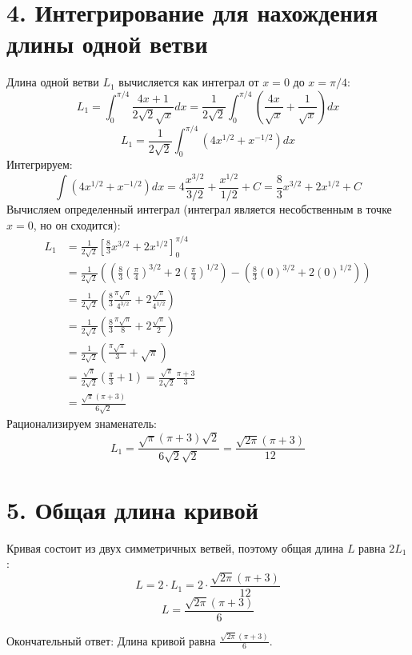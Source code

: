 \documentclass{article}
\begin{document}
\section*{4. Интегрирование для нахождения длины одной ветви}
Длина одной ветви $L_1$ вычисляется как интеграл от $x=0$ до $x=\pi/4$:
\[ L_1 = \int_0^{\pi/4} \frac{4x+1}{2\sqrt{2}\sqrt{x}} dx = \frac{1}{2\sqrt{2}} \int_0^{\pi/4} \left(\frac{4x}{\sqrt{x}} + \frac{1}{\sqrt{x}}\right) dx \]
\[ L_1 = \frac{1}{2\sqrt{2}} \int_0^{\pi/4} (4x^{1/2} + x^{-1/2}) dx \]
Интегрируем:
\[ \int (4x^{1/2} + x^{-1/2}) dx = 4\frac{x^{3/2}}{3/2} + \frac{x^{1/2}}{1/2} + C = \frac{8}{3}x^{3/2} + 2x^{1/2} + C \]
Вычисляем определенный интеграл (интеграл является несобственным в точке $x=0$, но он сходится):
\begin{align*}
    L_1 &= \frac{1}{2\sqrt{2}} \left[ \frac{8}{3}x^{3/2} + 2x^{1/2} \right]_0^{\pi/4} \\
    &= \frac{1}{2\sqrt{2}} \left( \left(\frac{8}{3}\left(\frac{\pi}{4}\right)^{3/2} + 2\left(\frac{\pi}{4}\right)^{1/2}\right) - \left(\frac{8}{3}(0)^{3/2} + 2(0)^{1/2}\right) \right) \\
    &= \frac{1}{2\sqrt{2}} \left( \frac{8}{3} \frac{\pi\sqrt{\pi}}{4^{3/2}} + 2\frac{\sqrt{\pi}}{4^{1/2}} \right) \\
    &= \frac{1}{2\sqrt{2}} \left( \frac{8}{3} \frac{\pi\sqrt{\pi}}{8} + 2\frac{\sqrt{\pi}}{2} \right) \\
    &= \frac{1}{2\sqrt{2}} \left( \frac{\pi\sqrt{\pi}}{3} + \sqrt{\pi} \right) \\
    &= \frac{\sqrt{\pi}}{2\sqrt{2}} \left( \frac{\pi}{3} + 1 \right) = \frac{\sqrt{\pi}}{2\sqrt{2}} \frac{\pi+3}{3} \\
    &= \frac{\sqrt{\pi}(\pi+3)}{6\sqrt{2}}
\end{align*}
Рационализируем знаменатель:
\[ L_1 = \frac{\sqrt{\pi}(\pi+3)\sqrt{2}}{6\sqrt{2}\sqrt{2}} = \frac{\sqrt{2\pi}(\pi+3)}{12} \]

\section*{5. Общая длина кривой}
Кривая состоит из двух симметричных ветвей, поэтому общая длина $L$ равна $2L_1$:
\[ L = 2 \cdot L_1 = 2 \cdot \frac{\sqrt{2\pi}(\pi+3)}{12} \]
\[ L = \frac{\sqrt{2\pi}(\pi+3)}{6} \]

Окончательный ответ: Длина кривой равна $\displaystyle \frac{\sqrt{2\pi}(\pi+3)}{6}$.
\end{document}
